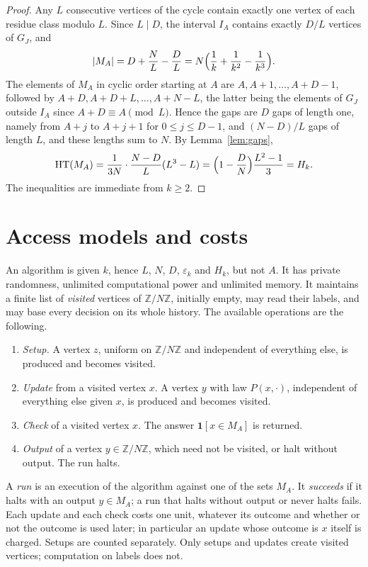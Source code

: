 \documentclass{amsart}
\theoremstyle{plain}
\theoremstyle{definition}
\theoremstyle{remark}
\newcommand{\Z}{\mathbb{Z}}
\newcommand{\eps}{\varepsilon}
\newcommand{\HT}{\mathrm{HT}}
\begin{document}
\begin{proof}
Any $L$ consecutive vertices of the cycle contain exactly one vertex of each residue class modulo $L$. Since $L\mid D$, the interval $I_A$ contains exactly $D/L$ vertices of $G_J$, and
\[
|M_A|=D+\frac NL-\frac DL=N\Bigl(\frac1k+\frac1{k^2}-\frac1{k^3}\Bigr).
\]
The elements of $M_A$ in cyclic order starting at $A$ are $A,A+1,\dots,A+D-1$, followed by $A+D,A+D+L,\dots,A+N-L$, the latter being the elements of $G_J$ outside $I_A$ since $A+D\equiv A\pmod L$. Hence the gaps are $D$ gaps of length one, namely from $A+j$ to $A+j+1$ for $0\le j\le D-1$, and $(N-D)/L$ gaps of length $L$, and these lengths sum to $N$. By Lemma~\ref{lem:gaps},
\[
\HT(M_A)=\frac1{3N}\cdot\frac{N-D}{L}(L^3-L)=\Bigl(1-\frac DN\Bigr)\frac{L^2-1}3=H_k .
\]
The inequalities are immediate from $k\ge 2$.
\end{proof}

\section{Access models and costs}\label{sec:models}

An algorithm is given $k$, hence $L$, $N$, $D$, $\eps_k$ and $H_k$, but not $A$. It has private randomness, unlimited computational power and unlimited memory. It maintains a finite list of \emph{visited} vertices of $\Z/N\Z$, initially empty, may read their labels, and may base every decision on its whole history. The available operations are the following.
\begin{enumerate}
\item[(S)] \emph{Setup.} A vertex $z$, uniform on $\Z/N\Z$ and independent of everything else, is produced and becomes visited.
\item[(U)] \emph{Update} from a visited vertex $x$. A vertex $y$ with law $P(x,\cdot)$, independent of everything else given $x$, is produced and becomes visited.
\item[(C)] \emph{Check} of a visited vertex $x$. The answer $\mathbf 1[x\in M_A]$ is returned.
\item[(O)] \emph{Output} of a vertex $y\in\Z/N\Z$, which need not be visited, or halt without output. The run halts.
\end{enumerate}
A \emph{run} is an execution of the algorithm against one of the sets $M_A$. It \emph{succeeds} if it halts with an output $y\in M_A$; a run that halts without output or never halts fails. Each update and each check costs one unit, whatever its outcome and whether or not the outcome is used later; in particular an update whose outcome is $x$ itself is charged. Setups are counted separately. Only setups and updates create visited vertices; computation on labels does not.
\end{document}

